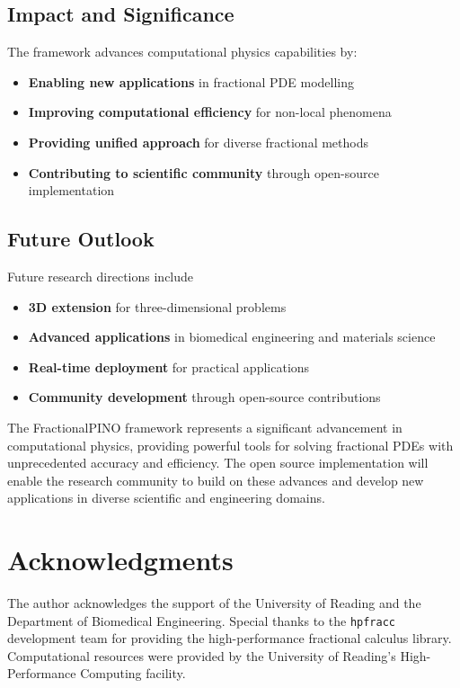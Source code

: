 \documentclass[12pt,a4paper]{article}
\theoremstyle{definition}
\begin{document}
\subsection{Impact and Significance}

The framework advances computational physics capabilities by:

\begin{itemize}
    \item \textbf{Enabling new applications} in fractional PDE modelling
    \item \textbf{Improving computational efficiency} for non-local phenomena
    \item \textbf{Providing unified approach} for diverse fractional methods
    \item \textbf{Contributing to scientific community} through open-source implementation
\end{itemize}

\subsection{Future Outlook}

Future research directions include

\begin{itemize}
    \item \textbf{3D extension} for three-dimensional problems
    \item \textbf{Advanced applications} in biomedical engineering and materials science
    \item \textbf{Real-time deployment} for practical applications
    \item \textbf{Community development} through open-source contributions
\end{itemize}

The FractionalPINO framework represents a significant advancement in computational physics, providing powerful tools for solving fractional PDEs with unprecedented accuracy and efficiency. The open source implementation will enable the research community to build on these advances and develop new applications in diverse scientific and engineering domains.

\section*{Acknowledgments}

The author acknowledges the support of the University of Reading and the Department of Biomedical Engineering. Special thanks to the \texttt{hpfracc} development team for providing the high-performance fractional calculus library. Computational resources were provided by the University of Reading's High-Performance Computing facility.



\end{document}
